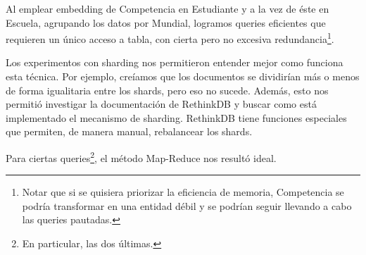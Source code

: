 \par Al emplear embedding de Competencia en Estudiante y a la vez de éste en Escuela, agrupando los datos 
por Mundial, logramos queries eficientes que requieren un único acceso a tabla, con cierta pero no excesiva 
redundancia\footnote{Notar que si se quisiera priorizar la eficiencia de memoria, 
Competencia se podría transformar en una entidad débil y se podrían seguir llevando
a cabo las queries pautadas.}.

\par Los experimentos con sharding nos permitieron entender mejor como funciona esta técnica.
Por ejemplo, creíamos que los documentos se dividirían más o menos de forma igualitaria entre los shards, pero eso no sucede.
Además, esto nos permitió investigar la documentación de RethinkDB y buscar como está implementado el mecanismo de sharding.
RethinkDB tiene funciones especiales que permiten, de manera manual, rebalancear los shards.

\par Para ciertas queries\footnote{En particular, las dos últimas.}, el método Map-Reduce nos resultó ideal.
